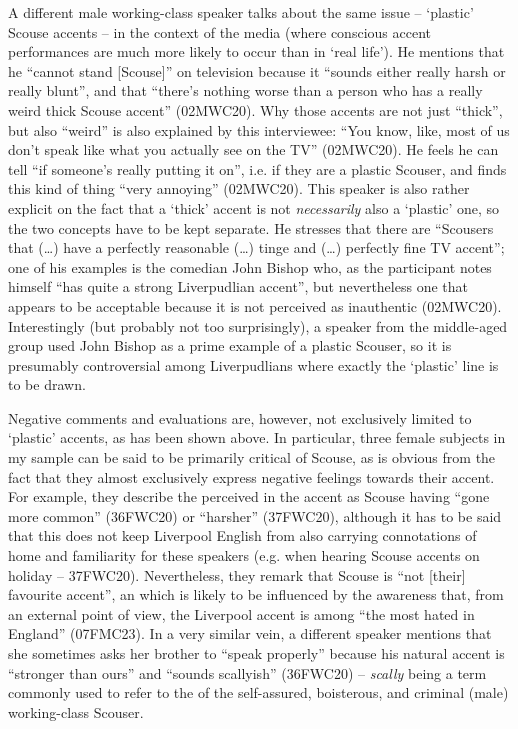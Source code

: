 A different male working-class speaker talks about the same issue -- `plastic' Scouse accents -- in the context of the media (where conscious accent performances are much more likely to occur than in `real life').
He mentions that he ``cannot stand [Scouse]'' on television because it ``sounds either really harsh or really blunt'', and that ``there's nothing worse than a person who has a really weird thick Scouse accent'' (02MWC20).
Why those accents are not just ``thick'', but also ``weird'' is also explained by this interviewee: ``You know, like, most of us don't speak like what you actually see on the TV'' (02MWC20).
He feels he can tell ``if someone's really putting it on'', i.e. if they are a plastic Scouser, and finds this kind of thing ``very annoying'' (02MWC20).
This speaker is also rather explicit on the fact that a `thick' accent is not \emph{necessarily} also a `plastic' one, so the two concepts have to be kept separate.
He stresses that there are ``Scousers that (\ldots) have a perfectly reasonable (\ldots) tinge and (\ldots) perfectly fine TV accent''; one of his examples is the comedian John Bishop who, as the participant notes himself ``has quite a strong Liverpudlian accent'', but nevertheless one that appears to be acceptable because it is not perceived as inauthentic (02MWC20).
Interestingly (but probably not too surprisingly), a speaker from the middle-aged group used John Bishop as a prime example of a plastic Scouser, so it is presumably controversial among Liverpudlians where exactly the `plastic' line is to be drawn.

Negative comments and evaluations are, however, not exclusively limited to `plastic' accents, as has been shown above.
In particular, three female subjects in my sample can be said to be primarily critical of Scouse, as is obvious from the fact that they almost exclusively express negative feelings towards their accent.
For example, they describe the perceived  in the accent as Scouse having ``gone more common'' (36FWC20) or ``harsher'' (37FWC20), although it has to be said that this does not keep Liverpool English from also carrying connotations of home and familiarity for these speakers (e.g. when hearing Scouse accents on holiday -- 37FWC20).
Nevertheless, they remark that Scouse is ``not [their] favourite accent'', an  which is likely to be influenced by the awareness that, from an external point of view, the Liverpool accent is among ``the most hated in England'' (07FMC23).
In a very similar vein, a different speaker mentions that she sometimes asks her brother to ``speak properly'' because his natural accent is ``stronger than ours'' and ``sounds scallyish'' (36FWC20) -- \emph{scally} being a term commonly used to refer to the  of the self-assured, boisterous, and criminal (male) working-class Scouser.

